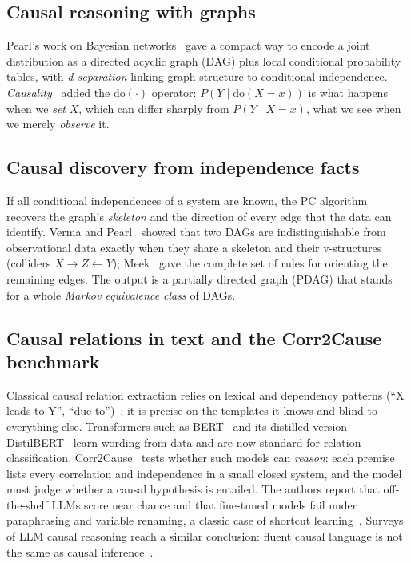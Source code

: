 \documentclass[11pt,a4paper]{article}
\newcommand{\doop}{\mathrm{do}}
\begin{document}
\subsection{Causal reasoning with graphs}
Pearl's work on Bayesian networks~\cite{pearl1988} gave a compact way to encode a joint distribution as a
directed acyclic graph (DAG) plus local conditional probability tables, with \emph{d-separation} linking graph
structure to conditional independence. \emph{Causality}~\cite{pearl2009} added the $\doop(\cdot)$ operator:
$P(Y \mid \doop(X{=}x))$ is what happens when we \emph{set} $X$, which can differ sharply from
$P(Y \mid X{=}x)$, what we see when we merely \emph{observe} it.

\subsection{Causal discovery from independence facts}
If all conditional independences of a system are known, the PC algorithm~\cite{spirtes2000} recovers the
graph's \emph{skeleton} and the direction of every edge that the data can identify. Verma and
Pearl~\cite{verma1990} showed that two DAGs are indistinguishable from observational data exactly when they
share a skeleton and their v-structures (colliders $X\!\rightarrow\!Z\!\leftarrow\!Y$); Meek~\cite{meek1995}
gave the complete set of rules for orienting the remaining edges. The output is a partially directed graph
(PDAG) that stands for a whole \emph{Markov equivalence class} of DAGs.

\subsection{Causal relations in text and the Corr2Cause benchmark}
Classical causal relation extraction relies on lexical and dependency patterns (``X leads to Y'', ``due to'')~\cite{khoo2000,girju2003};
it is precise on the templates it knows and blind to everything else. Transformers such as BERT~\cite{devlin2019}
and its distilled version DistilBERT~\cite{sanh2019} learn wording from data and are now standard for relation
classification. Corr2Cause~\cite{jin2024corr2cause} tests whether such models can \emph{reason}: each premise lists
every correlation and independence in a small closed system, and the model must judge whether a causal hypothesis
is entailed. The authors report that off-the-shelf LLMs score near chance and that fine-tuned models fail under
paraphrasing and variable renaming, a classic case of shortcut learning~\cite{gururangan2018,geirhos2020}.
Surveys of LLM causal reasoning reach a similar conclusion: fluent causal language is not the same as causal
inference~\cite{kiciman2023}.
\end{document}

